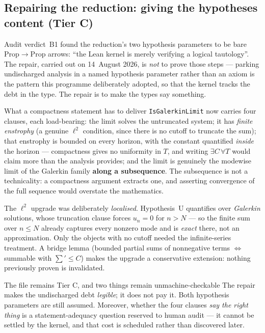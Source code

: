 \documentclass[11pt,a4paper]{article}
\newcommand{\tC}{\textcolor{TierC}{\textbf{Tier C}}}
\theoremstyle{definition}
\theoremstyle{plain}
\begin{document}
\subsection{Repairing the reduction: giving the hypotheses content (\tC{})}

Audit verdict~B1 found the reduction's two hypothesis parameters to be bare
$\mathrm{Prop}\to\mathrm{Prop}$ arrows: ``the Lean kernel is merely verifying a logical
tautology''. The repair, carried out on 14~August 2026, is \emph{not} to prove those steps ---
parking undischarged analysis in a named hypothesis parameter rather than an axiom is the
pattern this programme deliberately adopted, so that the kernel tracks the debt in the type. The
repair is to make the types say something.

\begin{keybox}{What a compactness statement has to deliver}
\texttt{IsGalerkinLimit} now carries four clauses, each load-bearing: the limit solves the
untruncated system; it has \emph{finite enstrophy} (a genuine $\ell^2$ condition, since there is
no cutoff to truncate the sum); that enstrophy is bounded on every horizon, with the constant
quantified \emph{inside} the horizon --- compactness gives no uniformity in $T$, and writing
$\exists C\,\forall T$ would claim more than the analysis provides; and the limit is genuinely
the modewise limit of the Galerkin family \textbf{along a subsequence}. The subsequence is not a
technicality: a compactness argument extracts one, and asserting convergence of the full
sequence would overstate the mathematics.
\end{keybox}

The $\ell^2$ upgrade was deliberately \emph{localised}. Hypothesis~U quantifies over
\emph{Galerkin} solutions, whose truncation clause forces $u_n=0$ for $n>N$ --- so the finite
sum over $n \le N$ already captures every nonzero mode and is \emph{exact} there, not an
approximation. Only the objects with no cutoff needed the infinite-series treatment. A bridge
lemma (bounded partial sums of nonnegative terms $\iff$ summable with $\sum' \le C$) makes the
upgrade a conservative extension: nothing previously proven is invalidated.

\begin{warnbox}{The file remains Tier C, and two things remain unmachine-checkable}
The repair makes the undischarged debt \emph{legible}; it does not pay it. Both hypothesis
parameters are still assumed. Moreover, whether the four clauses \emph{say the right thing} is a
statement-adequacy question reserved to human audit --- it cannot be settled by the kernel, and
that cost is scheduled rather than discovered later.
\end{warnbox}
\end{document}
